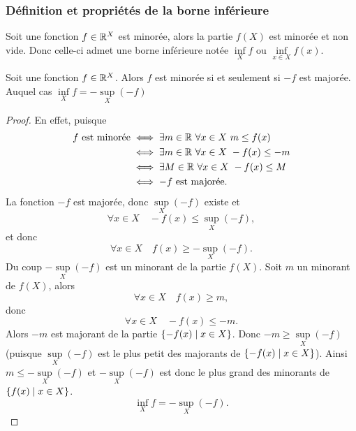 \subsubsection{Définition et propriétés de la borne inférieure}
\begin{defdef}
  Soit une fonction $f \in \mathbb{R}^X$ est minorée, alors la partie $f(X)$ est minorée et non vide. Donc celle-ci admet une borne inférieure notée $\inf\limits_{X} f$ ou $\inf\limits_{x \in X} f(x)$.
\end{defdef}
\begin{lemme}
  Soit une fonction $f \in \mathbb{R}^X$. Alors $f$ est minorée si et seulement si $-f$ est majorée. Auquel cas $\inf\limits_{X} f = -\sup\limits_{X} (-f)$
\end{lemme}
\begin{proof}
  En effet, puisque
  \begin{align}
    f \text{~est minorée} &\iff \exists m \in \R \ \forall x \in X \ m \leq f(x)\\
    &\iff \exists m \in \R \ \forall x \in X \ -f(x) \leq -m\\
    &\iff \exists M \in \R \ \forall x \in X \ -f(x) \leq M\\
    &\iff -f \text{~est majorée}.
  \end{align}
  La fonction $-f$ est majorée, donc $\sup\limits_{X} (-f)$ existe et 
  \begin{equation}
    \forall x \in X \quad -f(x) \leq \sup\limits_{X}(-f),
  \end{equation}
  et donc
  \begin{equation}
    \forall x \in X \quad f(x) \geq -\sup\limits_{X}(-f).
  \end{equation}
  Du coup $-\sup\limits_{X}(-f)$ est un minorant de la partie $f(X)$. Soit $m$ un minorant de $f(X)$, alors 
  \begin{equation}
    \forall x \in X \quad f(x) \geq m,
  \end{equation}
  donc 
  \begin{equation}
    \forall x \in X \quad -f(x) \leq -m.
  \end{equation}
  Alors $-m$ est majorant de la partie $\left\{-f(x)\mathrel{}\middle|\mathrel{}x \in X\right\}$. Donc $-m \geq \sup\limits_{X}(-f)$ (puisque $\sup\limits_{X}(-f)$ est le plus petit des majorants de $\left\{-f(x)\mathrel{}\middle|\mathrel{}x \in X\right\}$). Ainsi $m \leq -\sup\limits_{X}(-f)$ et $-\sup\limits_{X}(-f)$ est donc le plus grand des minorants de $\left\{f(x)\mathrel{}\middle|\mathrel{}x \in X\right\}$.
  \begin{equation}
    \inf\limits_{X} f = -\sup\limits_{X} (-f).
  \end{equation}
\end{proof}
